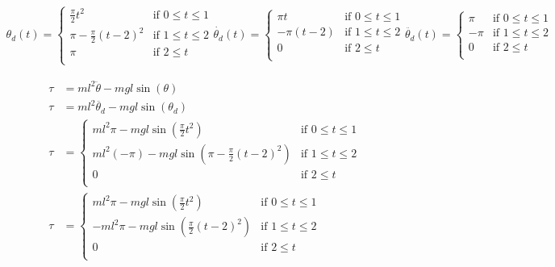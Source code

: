 \begin{solutionbox}[Q1-6]
    \begin{align*}
        \theta_d(t) =
        \begin{cases}
            \frac{\pi}{2}t^2         & \text{if } 0 \leq t \leq 1 \\
            \pi-\frac{\pi}{2}(t-2)^2 & \text{if } 1 \le  t \leq 2 \\
            \pi                      & \text{if } 2 \le  t        \\
        \end{cases}
        \dot{\theta_d}(t) =
        \begin{cases}
            \pi t      & \text{if } 0 \leq t \leq 1 \\
            -\pi (t-2) & \text{if } 1 \le  t \leq 2 \\
            0          & \text{if } 2 \le  t        \\
        \end{cases}
        \ddot{\theta_d}(t) =
        \begin{cases}
            \pi  & \text{if } 0 \leq t \leq 1 \\
            -\pi & \text{if } 1 \le  t \leq 2 \\
            0    & \text{if } 2 \le  t        \\
        \end{cases}
    \end{align*}

    \begin{align*}
        \tau & = ml^2\ddot{\theta} - mgl\sin(\theta)                                    \\
        \tau & = ml^2\ddot{\theta_d} - mgl\sin(\theta_d)                                \\
        \tau & =
        \begin{cases}
            ml^2\pi - mgl\sin(\frac{\pi}{2}t^2)            & \text{if } 0 \leq t \leq 1 \\
            ml^2(-\pi) - mgl\sin(\pi-\frac{\pi}{2}(t-2)^2) & \text{if } 1 \le  t \leq 2 \\
            0                                              & \text{if } 2 \le  t        \\
        \end{cases} \\
        \tau & =
        \begin{cases}
            ml^2\pi - mgl\sin(\frac{\pi}{2}t^2)      & \text{if } 0 \leq t \leq 1 \\
            -ml^2\pi - mgl\sin(\frac{\pi}{2}(t-2)^2) & \text{if } 1 \le  t \leq 2 \\
            0                                        & \text{if } 2 \le  t        \\
        \end{cases}       \\
    \end{align*}
\end{solutionbox}

